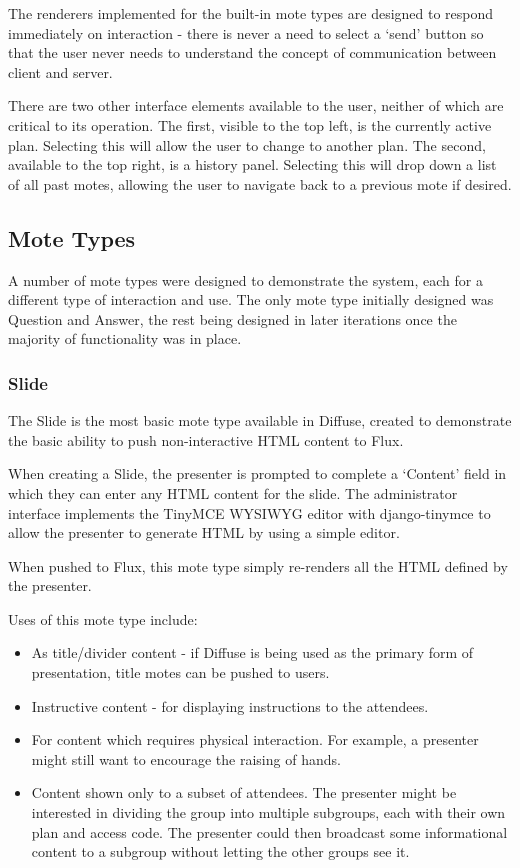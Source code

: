\documentclass[a4papert,11pt,notitlepage]{article}
\begin{document}
The renderers implemented for the built-in mote types are designed to respond immediately on interaction - there is never a need to select a `send' button so that the user never needs to understand the concept of communication between client and server.

There are two other interface elements available to the user, neither of which are critical to its operation. The first, visible to the top left, is the currently active plan. Selecting this will allow the user to change to another plan. The second, available to the top right, is a history panel. Selecting this will drop down a list of all past motes, allowing the user to navigate back to a previous mote if desired.

\subsection{Mote Types}
\label{sec:motetypes}
A number of mote types were designed to demonstrate the system, each for a different type of interaction and use. The only mote type initially designed was Question and Answer, the rest being designed in later iterations once the majority of functionality was in place.

\subsubsection{Slide}
The Slide is the most basic mote type available in Diffuse, created to demonstrate the basic ability to push non-interactive HTML content to Flux.

When creating a Slide, the presenter is prompted to complete a `Content' field in which they can enter any HTML content for the slide. The administrator interface implements the TinyMCE\cite{tinymce:web} WYSIWYG editor with django-tinymce\cite{djangotinymce:web} to allow the presenter to generate HTML by using a simple editor.

When pushed to Flux, this mote type simply re-renders all the HTML defined by the presenter.

Uses of this mote type include:
\begin{itemize}
\item As title/divider content - if Diffuse is being used as the primary form of presentation, title motes can be pushed to users.
\item Instructive content - for displaying instructions to the attendees.
\item For content which requires physical interaction. For example, a presenter might still want to encourage the raising of hands.
\item Content shown only to a subset of attendees. The presenter might be interested in dividing the group into multiple subgroups, each with their own plan and access code. The presenter could then broadcast some informational content to a subgroup without letting the other groups see it.
\end{itemize}
\end{document}
